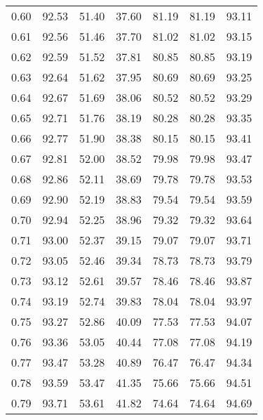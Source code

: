 \begin{tabular}{|c|c|c|c|c|c|c|}
      0.60 &     92.53 &     51.40 &      37.60 &   81.19 &      81.19 &         93.11 \\
      0.61 &     92.56 &     51.46 &      37.70 &   81.02 &      81.02 &         93.15 \\
      0.62 &     92.59 &     51.52 &      37.81 &   80.85 &      80.85 &         93.19 \\
      0.63 &     92.64 &     51.62 &      37.95 &   80.69 &      80.69 &         93.25 \\
      0.64 &     92.67 &     51.69 &      38.06 &   80.52 &      80.52 &         93.29 \\
      0.65 &     92.71 &     51.76 &      38.19 &   80.28 &      80.28 &         93.35 \\
      0.66 &     92.77 &     51.90 &      38.38 &   80.15 &      80.15 &         93.41 \\
      0.67 &     92.81 &     52.00 &      38.52 &   79.98 &      79.98 &         93.47 \\
      0.68 &     92.86 &     52.11 &      38.69 &   79.78 &      79.78 &         93.53 \\
      0.69 &     92.90 &     52.19 &      38.83 &   79.54 &      79.54 &         93.59 \\
      0.70 &     92.94 &     52.25 &      38.96 &   79.32 &      79.32 &         93.64 \\
      0.71 &     93.00 &     52.37 &      39.15 &   79.07 &      79.07 &         93.71 \\
      0.72 &     93.05 &     52.46 &      39.34 &   78.73 &      78.73 &         93.79 \\
      0.73 &     93.12 &     52.61 &      39.57 &   78.46 &      78.46 &         93.87 \\
      0.74 &     93.19 &     52.74 &      39.83 &   78.04 &      78.04 &         93.97 \\
      0.75 &     93.27 &     52.86 &      40.09 &   77.53 &      77.53 &         94.07 \\
      0.76 &     93.36 &     53.05 &      40.44 &   77.08 &      77.08 &         94.19 \\
      0.77 &     93.47 &     53.28 &      40.89 &   76.47 &      76.47 &         94.34 \\
      0.78 &     93.59 &     53.47 &      41.35 &   75.66 &      75.66 &         94.51 \\
      0.79 &     93.71 &     53.61 &      41.82 &   74.64 &      74.64 &         94.69 \\

\end{tabular}
